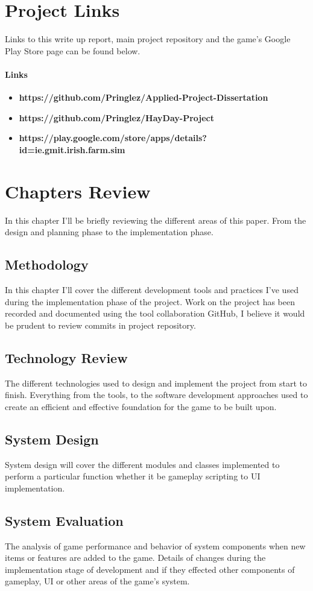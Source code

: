 \section{Project Links}
Links to this write up report, main project repository and the game's Google Play Store page can be found below.
\paragraph{Links}
\begin{itemize}
	\item \textbf{https://github.com/Pringlez/Applied-Project-Dissertation}
	\item \textbf{https://github.com/Pringlez/HayDay-Project}
	\item \textbf{https://play.google.com/store/apps/details?id=ie.gmit.irish.farm.sim}
\end{itemize}
\section{Chapters Review}
In this chapter I'll be briefly reviewing the different areas of this paper. From the design and planning phase to the implementation phase.
\subsection{Methodology}
In this chapter I'll cover the different development tools and practices I've used during the implementation phase of the project. Work on the project has been recorded and documented using the tool collaboration GitHub, I believe it would be prudent to review commits in project repository.
\subsection{Technology Review}
The different technologies used to design and implement the project from start to finish. Everything from the tools, to the software development approaches used to create an efficient and effective foundation for the game to be built upon.
\subsection{System Design}
System design will cover the different modules and classes implemented to perform a particular function whether it be gameplay scripting to UI implementation.
\subsection{System Evaluation}
The analysis of game performance and behavior of system components when new items or features are added to the game. Details of changes during the implementation stage of development and if they effected other components of gameplay, UI or other areas of the game's system.
